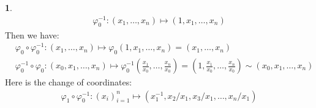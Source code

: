 \documentclass[10.5pt]{article}
\theoremstyle{definition}
\newtheorem{pb}{}
\begin{document}
\begin{pb}
    \begin{align*}
        \varphi_0^{-1}:(x_1,\hdots,x_n) \mapsto (1,x_1,\hdots,x_n)
    \end{align*}
    Then we have:
    \begin{align*}
        &\varphi_0 \circ \varphi_0^{-1}:(x_1,\hdots,x_n)\mapsto \varphi_0 (1,x_1,\hdots,x_n) = (x_1,\hdots,x_n) \\
        &\varphi_0^{-1} \circ \varphi_0:(x_0,x_1,\hdots,x_n) \mapsto \varphi_0^{-1} (\frac{x_1}{x_0},\hdots,\frac{x_n}{x_0}) =
         (1,\frac{x_1}{x_0},\hdots,\frac{x_n}{x_0}) \sim (x_0,x_1,\hdots,x_n)
    \end{align*}
    Here is the change of coordinates:
    \begin{align*}
        \varphi_1\circ\varphi_0^{-1}: (x_i)_{i=1}^n \mapsto (x_1^{-1},x_2/x_1, x_3/x_1, \hdots, x_n/x_1)
    \end{align*}
\end{pb}
\end{document}
